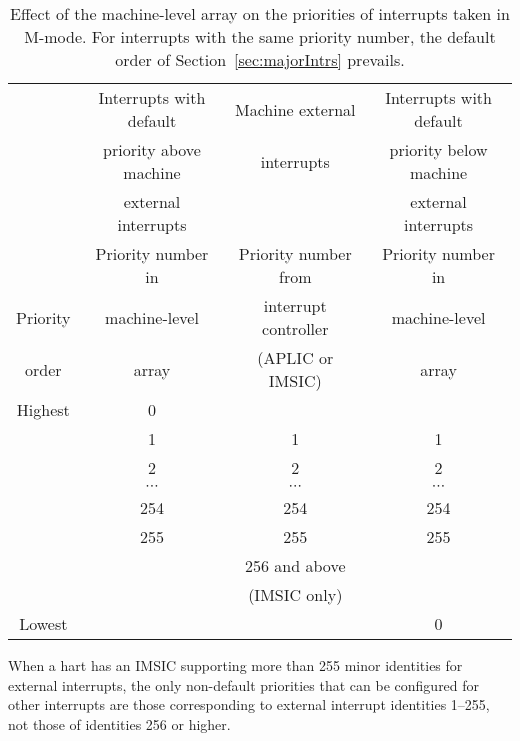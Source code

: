 \begin{table*}[h!]
\begin{center}
\begin{tabular}{|c|c|c|c|}
\hline
 & Interrupts with default & Machine external & Interrupts with default \\
 & priority above machine  & interrupts       & priority below machine \\
 & external interrupts     &                  & external interrupts \\
\hline
         & Priority number in & Priority number from & Priority number in \\
Priority & machine-level      & interrupt controller & machine-level \\
order    & \z{iprio} array    & (APLIC or IMSIC)     & \z{iprio} array \\
\hline
\hline
Highest  & 0                  &                      & \\
\cline{2-4}
         & 1                  & 1                    & 1 \\
         & 2                  & 2                    & 2 \\
         & $\cdots$           & $\cdots$             & $\cdots$ \\
         & 254                & 254                  & 254 \\
         & 255                & 255                  & 255 \\
\cline{2-4}
         &                    & 256 and above        & \\
         &                    & (IMSIC only)         & \\
\cline{2-4}
Lowest   &                    &                      & 0 \\
\hline
\end{tabular}
\end{center}
\caption{%
Effect of the machine-level  array on the priorities of
interrupts taken in \mbox{M-mode}.
For interrupts with the same priority number, the default order of
Section~\ref{sec:majorIntrs} prevails.%
}
\label{tab:intrPrios-M}
\end{table*}

\begin{commentary}
When a hart has an IMSIC supporting more than 255 minor identities
for external interrupts, the only non-default priorities that can be
configured for other interrupts are those corresponding to external
interrupt identities 1--255, not those of identities 256 or higher.
\end{commentary}

